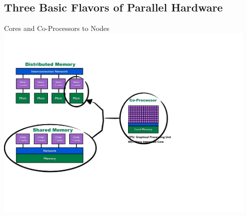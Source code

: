 \subsection{Three Basic Flavors of Parallel Hardware}
\makesubcontentsslidessec

\begin{frame}{Cores and Co-Processors to Nodes}
\includegraphics[width=0.95\textwidth]
{../common/pics/hardware/ParallelHardware4.pdf}
\end{frame}



